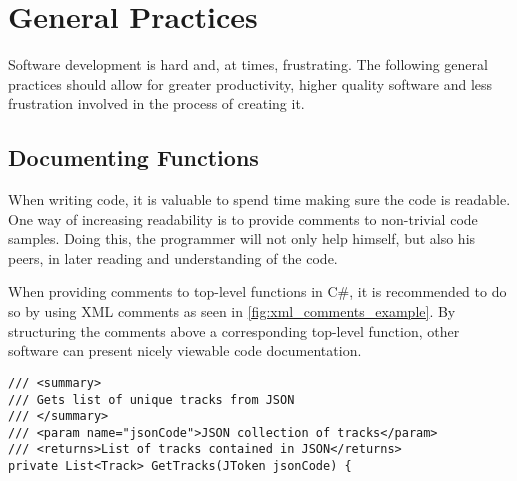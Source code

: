 \section{General Practices}
\label{imp:general_practices}

Software development is hard and, at times, frustrating. The following
general practices should allow for greater productivity, higher
quality software and less frustration involved in the process of creating it.

\subsection{Documenting Functions}
When writing code, it is valuable to spend time making sure the
code is readable. One way of increasing readability is to provide comments
to non-trivial code samples. Doing this, the programmer will not only
help himself, but also his peers, in later reading and understanding of the code.

When providing comments to top-level functions in C\#, it is
recommended to do so by using XML comments as seen in
\cref{fig:xml_comments_example}. By structuring the comments above a
corresponding top-level function, other software can present nicely
viewable code documentation.

\begin{lstlisting}[caption = {Example of XML-comments on top of C\# function.}, label={fig:xml_comments_example}]
/// <summary>
/// Gets list of unique tracks from JSON
/// </summary>
/// <param name="jsonCode">JSON collection of tracks</param>
/// <returns>List of tracks contained in JSON</returns>
private List<Track> GetTracks(JToken jsonCode) {
\end{lstlisting}

